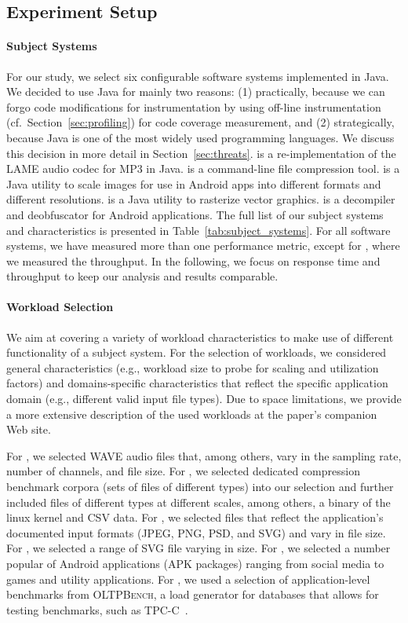 \subsection{Experiment Setup}\label{sec:setup}
\paragraph*{Subject Systems}
For our study, we select six configurable software systems implemented in Java. We decided to use Java for mainly two reasons: (1) practically, because we can forgo code modifications for instrumentation by using off-line instrumentation (cf.~Section~\ref{sec:profiling}) for code coverage measurement, and (2) strategically, because Java is one of the most widely used programming languages. We discuss this decision in more detail in Section~\ref{sec:threats}. 
\jumper is a re-implementation of the LAME audio codec for MP3 in Java. \kanzi is a command-line file compression tool. \dconvert is a Java utility to scale images for use in Android apps into different formats and different resolutions. \batik is a Java utility to rasterize vector graphics. \jadx is a decompiler and deobfuscator for Android applications. The full list of our subject systems and characteristics is presented in Table~\ref{tab:subject_systems}. 
For all software systems, we have measured more than one performance metric, except for \htwo, where we measured the throughput.  In the following, we focus on response time and throughput to keep our analysis and results comparable.

\paragraph*{Workload Selection}	
We aim at covering a variety of workload characteristics to make use of different functionality of a subject system. 
For the selection of workloads, we considered general characteristics (e.g., workload size to probe for scaling and utilization factors) and domains-specific characteristics that reflect the specific application domain (e.g., different valid input file types).
Due to space limitations, we provide a more extensive description of the used workloads at the paper's companion Web site.

For \jumper, we selected WAVE audio files that, among others, vary in the sampling rate, number of channels, and file size. For \kanzi, we selected dedicated compression benchmark corpora (sets of files of different types) into our selection and further included files of different types at different scales, among others, a binary of the linux kernel and CSV data. For \dconvert, we selected files that reflect the application’s documented input formats (JPEG, PNG, PSD, and SVG) and vary in file size. For \batik, we selected a range of SVG file varying in size. For \jadx, we selected a number popular of Android applications (APK packages) ranging from social media to games and utility applications. For \htwo, we used a selection of application-level benchmarks from \textsc{OLTPBench}, a load generator for databases that allows for testing benchmarks, such as TPC-C~\cite{difallah_oltp_2013}. 


